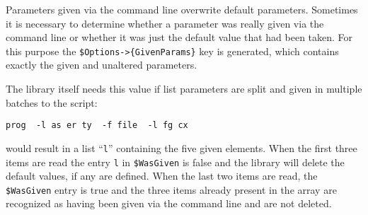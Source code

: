 \documentclass[12pt, a4paper]{article}
\begin{document}
Parameters given via the command line overwrite default parameters. Sometimes it is necessary to determine whether a parameter was really given via the command line or whether it was just the default value that had been taken. For this purpose the \verb'$Options->{GivenParams}' key is generated, which contains exactly the given and unaltered parameters.

The library itself needs this value if list parameters are split and given in multiple batches to the script:

\begin{verbatim}
prog  -l as er ty  -f file  -l fg cx
\end{verbatim}

would result in a list ``\verb'l''' containing the five given elements. When the first three items are read the entry \verb'l' in \verb'$WasGiven' is false and the library will delete the default values, if any are defined. When the last two items are read, the \verb'$WasGiven' entry is true and the three items already present in the array are recognized as having been given via the command line and are not deleted.
\end{document}
